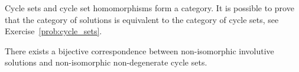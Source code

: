 Cycle sets and cycle set homomorphisms form a category. 
It is possible to prove that the category of 
solutions is equivalent to the category of cycle sets, 
see Exercise~\ref{prob:cycle_sets}. 




\begin{theorem}
\label{thm:CS}
There exists a bijective correspondence between non-isomorphic involutive solutions 
and non-isomorphic non-degenerate cycle sets. 
\end{theorem}



    
